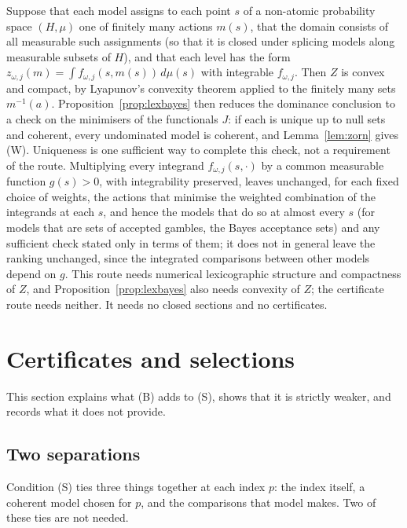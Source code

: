 \documentclass[11pt]{article}
\theoremstyle{definition}
\theoremstyle{remark}
\begin{document}
Suppose that each model assigns to each point $s$ of a non-atomic probability space $(H,\mu)$ one of finitely many actions $m(s)$, that the domain consists of all measurable such assignments (so that it is closed under splicing models along measurable subsets of $H$), and that each level has the form $z_{\omega,j}(m)=\int f_{\omega,j}(s,m(s))\,d\mu(s)$ with integrable $f_{\omega,j}$. Then $Z$ is convex and compact, by Lyapunov's convexity theorem applied to the finitely many sets $m^{-1}(a)$. Proposition~\ref{prop:lexbayes} then reduces the dominance conclusion to a check on the minimisers of the functionals $J$: if each is unique up to null sets and coherent, every undominated model is coherent, and Lemma~\ref{lem:zorn} gives (W). Uniqueness is one sufficient way to complete this check, not a requirement of the route. Multiplying every integrand $f_{\omega,j}(s,\cdot)$ by a common measurable function $g(s)>0$, with integrability preserved, leaves unchanged, for each fixed choice of weights, the actions that minimise the weighted combination of the integrands at each $s$, and hence the models that do so at almost every $s$ (for models that are sets of accepted gambles, the Bayes acceptance sets) and any sufficient check stated only in terms of them; it does not in general leave the ranking unchanged, since the integrated comparisons between other models depend on $g$. This route needs numerical lexicographic structure and compactness of $Z$, and Proposition~\ref{prop:lexbayes} also needs convexity of $Z$; the certificate route needs neither. It needs no closed sections and no certificates.

\section{Certificates and selections}\label{sec:compare}
This section explains what (B) adds to (S), shows that it is strictly weaker, and records what it does not provide.

\subsection{Two separations}\label{sec:separations}
Condition (S) ties three things together at each index $p$: the index itself, a coherent model chosen for $p$, and the comparisons that model makes. Two of these ties are not needed.
\end{document}
